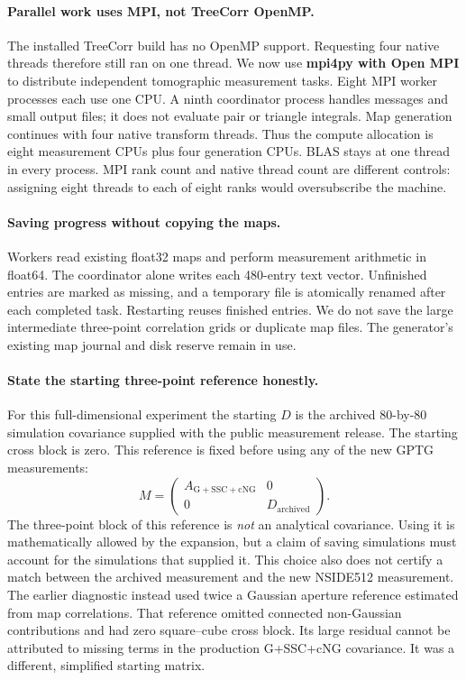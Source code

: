 \paragraph{Parallel work uses MPI, not TreeCorr OpenMP.}
The installed TreeCorr build has no OpenMP support. Requesting four native
threads therefore still ran on one thread. We now use \textbf{mpi4py with
Open MPI} to distribute independent tomographic measurement tasks. Eight
MPI worker processes each use one CPU. A ninth coordinator process handles
messages and small output files; it does not evaluate pair or triangle
integrals. Map generation continues with four native transform threads.
Thus the compute allocation is eight measurement CPUs plus four generation
CPUs. BLAS stays at one thread in every process. MPI rank count and native
thread count are different controls: assigning eight threads to each of
eight ranks would oversubscribe the machine.

\paragraph{Saving progress without copying the maps.}
Workers read existing float32 maps and perform measurement arithmetic in
float64. The coordinator alone writes each 480-entry text vector. Unfinished
entries are marked as missing, and a temporary file is atomically renamed
after each completed task. Restarting reuses finished entries. We do not
save the large intermediate three-point correlation grids or duplicate
map files. The generator's existing map journal and disk reserve remain
in use.

\paragraph{State the starting three-point reference honestly.}
For this full-dimensional experiment the starting $D$ is the archived
80-by-80 simulation covariance supplied with the public measurement release.
The starting cross block is zero. This reference is fixed before using
any of the new GPTG measurements:
\begin{equation}
 M=\begin{pmatrix}A_{\mathrm{G+SSC+cNG}}&0\\0&D_{\mathrm{archived}}\end{pmatrix}.
\end{equation}
The three-point block of this reference is \emph{not} an analytical covariance.
Using it is mathematically allowed by the expansion, but a claim of saving
simulations must account for the simulations that supplied it. This choice
also does not certify a match between the archived measurement and the new
NSIDE512 measurement. The earlier diagnostic instead used twice a Gaussian
aperture reference estimated from map correlations. That reference omitted
connected non-Gaussian contributions and had zero square--cube cross block.
Its large residual cannot be attributed to missing terms in the production
G+SSC+cNG covariance. It was a different, simplified starting matrix.

